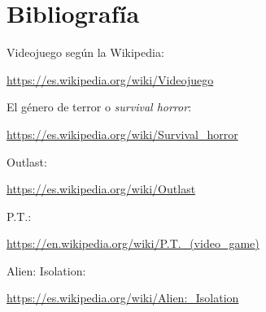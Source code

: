 \chapter{Bibliografía}
\label{bibliografia}

Videojuego según la Wikipedia:

\url{https://es.wikipedia.org/wiki/Videojuego}

El género de terror o \textit{survival horror}:

\url{https://es.wikipedia.org/wiki/Survival_horror}

Outlast:

\url{https://es.wikipedia.org/wiki/Outlast}

P.T.:

\url{https://en.wikipedia.org/wiki/P.T._(video_game)}

Alien: Isolation:

\url{https://es.wikipedia.org/wiki/Alien:_Isolation}